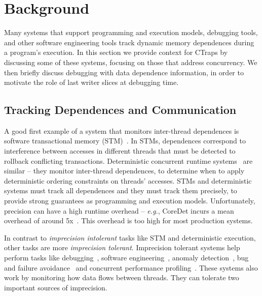 \documentclass[preprint,9pt]{sigplanconf}
\newcommand{\ctraps}{CTraps\xspace}
\begin{document}
\section{Background}

Many systems that support programming and execution models, debugging tools,
and other software engineering tools track dynamic memory dependences during a
program's execution.  In this section we provide context for \ctraps by
discussing some of these systems, focusing on those that address concurrency.
We then briefly discuss debugging with data dependence information, in order to
motivate the role of last writer slices at debugging time.

\subsection{Tracking Dependences and Communication}
\label{sec:background:comm}

A good first example of a system that monitors inter-thread dependences is
software transactional memory (STM)~\cite{stm}.  In STMs, dependences
correspond to interference between accesses in different threads that must be
detected to rollback conflicting transactions.  Deterministic concurrent
runtime systems~\cite{coredet,grace} are similar -- they monitor
inter-thread dependences, to determine when to apply deterministic ordering
constraints on threads' accesses.  STMs and deterministic systems must track
all dependences and they must track them precisely, to provide strong
guarantees as programming and execution models.  Unfortunately, precision can
have a high runtime overhead -- {\em e.g.}, CoreDet incurs a mean overhead of
around 5x~\cite{coredet}.  This overhead is too high for most production
systems.  


In contrast to {\em imprecision intolerant} tasks like STM and deterministic
execution, other tasks are more {\em imprecision tolerant}.  Imprecision
tolerant systems help perform tasks like
debugging~\cite{defuse,conseq,recon,bugaboo,raceslicing,fasttrack,falcon},
software engineering~\cite{oshajava,oshatr}, anomaly
detection~\cite{avio,dmtracker,cci,daikon}, bug and failure
avoidance~\cite{aviso,cfix} and concurrent performance
profiling~\cite{threadcriticality,schedpredictionmodel}.  These
systems also work by monitoring how data flows between threads.  They can
tolerate two important sources of imprecision.
\end{document}
